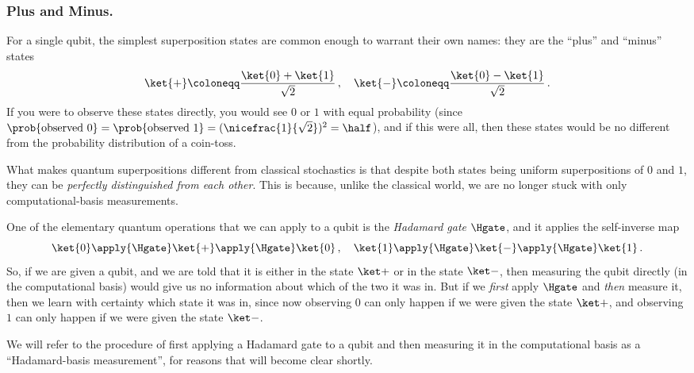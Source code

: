     \subsubsection{Plus and Minus.}
      For a single qubit, the simplest superposition states are common enough to
        warrant their own names: they are the
        ``plus'' and ``minus'' states
        \[
          \ket{+} \coloneqq \frac{\ket{0} + \ket{1}}{\sqrt{2}}\, , \quad 
          \ket{-} \coloneqq \frac{\ket{0} - \ket{1}}{\sqrt{2}}\, .
        \]
        If you were to observe these states directly, you would see $0$ or $1$
        with equal probability (since $\prob{\text{observed } 0} =
        \prob{\text{observed } 1} = (\nicefrac{1}{\sqrt 2})^2 = \half$),
        and if this were all, then these states would be no different from the
        probability distribution of a coin-toss.

      What makes quantum superpositions different from classical stochastics is
        that despite both states being uniform superpositions of $0$ and $1$,
        they can be \emph{perfectly distinguished from each other}. This is
        because, unlike the classical world, we are no longer stuck with only
        computational-basis measurements. 

      One of the elementary quantum operations that we can apply to a qubit is
        the \emph{Hadamard gate} $\Hgate$, and it applies the self-inverse map
      \[
        \ket{0} \apply{\Hgate} \ket{+} \apply{\Hgate} \ket{0}\, , \quad
        \ket{1} \apply{\Hgate} \ket{-} \apply{\Hgate} \ket{1}\, .
      \]
      So, if we are given a qubit, and we are told that it is either in the
        state $\ket +$ or in the state $\ket -$, then
        measuring the qubit directly (in the computational basis) 
        would give us no information about which
        of the two it was in. But if we \emph{first} apply $\Hgate$ and \emph{then}
        measure it, then we learn with certainty which state it was in,
        since now observing $0$ can only happen if we were given the state $\ket +$,
        and observing $1$ can only happen if we were given the state $\ket -$.

      We will refer to the procedure of first applying a Hadamard gate to a
        qubit and then measuring it in the computational basis as a
        ``Hadamard-basis measurement'', for reasons that will become clear
        shortly.

